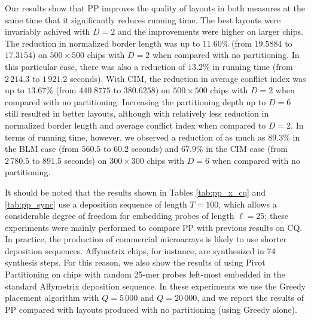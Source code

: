 Our results show that PP improves the quality of layouts in both measures at the
same time that it significantly reduces running time. The best layouts were
invariably achived with $D=2$ and the improvements were higher on larger chips.
The reduction in normalized border length was up to $11.60\%$ (from $19.5884$ to
$17.3154$) on $500\times 500$ chips with $D=2$ when compared with no
partitioning. In this particular case, there was also a reduction of $13.2\%$ in
running time (from $2\,214.3$ to $1\,921.2$ seconds). With CIM, the reduction in
average conflict index was up to $13.67\%$ (from $440.8775$ to $380.6258$) on
$500\times 500$ chips with $D=2$ when compared with no partitioning. Increasing
the partitioning depth up to $D=6$ still resulted in better layouts, although
with relatively less reduction in normalized border length and average conflict
index when compared to $D=2$. In terms of running time, however, we observed a
reduction of as much as $89.3\%$ in the BLM case (from $560.5$ to $60.2$
seconds) and $67.9\%$ in the CIM case (from $2\,780.5$ to $891.5$ seconds) on
$300\times 300$ chips with $D=6$ when compared with no partitioning.

It should be noted that the results shown in Tables \ref{tab:pp_x_cq} and
\ref{tab:pp_sync} use a deposition sequence of length $T=100$, which allows a
considerable degree of freedom for embedding probes of length $\ell=25$; these
experiments were mainly performed to compare PP with previous results on CQ. In
practice, the production of commercial microarrays is likely to use shorter
deposition sequences. Affymetrix chips, for instance, are synthesized in 74
synthesis steps. For this reason, we also show the results of using Pivot
Partitioning on chips with random 25-mer probes left-most embedded in the
standard Affymetrix deposition sequence. In these experiments we use the Greedy
placement algorithm with $Q=5\,000$ and $Q=20\,000$, and we report the results
of PP compared with layouts produced with no partitioning (using Greedy alone).

